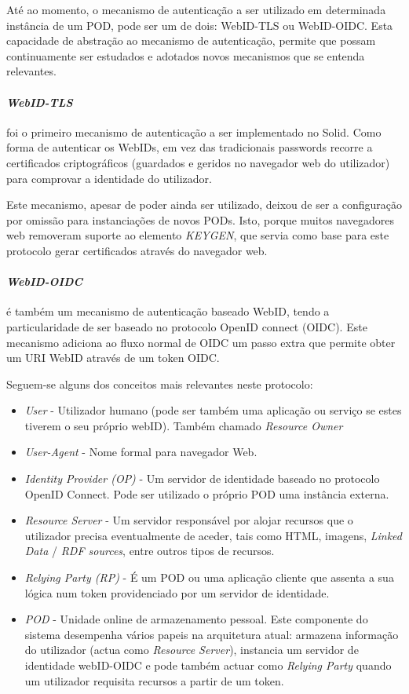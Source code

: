 Até ao momento, o mecanismo de autenticação a ser utilizado em determinada instância de um POD, pode ser um de dois: WebID-TLS ou WebID-OIDC. Esta capacidade de abstração ao mecanismo de autenticação, permite que possam continuamente ser estudados e adotados novos mecanismos que se entenda relevantes.\cite{solid_spec}

\paragraph{\emph{WebID-TLS}}
foi o primeiro mecanismo de autenticação a ser implementado no Solid. Como forma de autenticar os WebIDs, em vez das tradicionais passwords recorre a certificados criptográficos (guardados e geridos no navegador web do utilizador) para comprovar a identidade do utilizador.\cite{solid_webid-tls:}

Este mecanismo, apesar de poder ainda ser utilizado, deixou de ser a configuração por omissão para instanciações de novos PODs. Isto, porque muitos navegadores web removeram suporte ao elemento \emph{KEYGEN}, que servia como base para este protocolo gerar certificados através do navegador web.\cite{solid_webid-tls:}

\paragraph{\emph{WebID-OIDC}}
é também um mecanismo de autenticação baseado WebID, tendo a particularidade de ser baseado no protocolo OpenID connect (OIDC). Este mecanismo adiciona ao fluxo normal de OIDC um passo extra que permite obter um URI WebID através de um token OIDC.\cite{solid_webid_oidc}

Seguem-se alguns dos conceitos mais relevantes neste protocolo:
\begin{itemize}
    \item \emph{User} - Utilizador humano (pode ser também uma aplicação ou serviço se estes tiverem o seu próprio webID). Também chamado \emph{Resource Owner}
    \item \emph{User-Agent} - Nome formal para navegador Web.
    \item \emph{Identity Provider (OP)} - Um servidor de identidade baseado no protocolo OpenID Connect. Pode ser utilizado o próprio POD uma instância externa.
    \item \emph{Resource Server} - Um servidor responsável por alojar recursos que o utilizador precisa eventualmente de aceder, tais como HTML, imagens, \emph{Linked Data} / \emph{RDF sources}, entre outros tipos de recursos.
    \item \emph{Relying Party (RP)} - É um POD ou uma aplicação cliente que assenta a sua lógica num token providenciado por um servidor de identidade.
    \item \emph{POD} - Unidade online de armazenamento pessoal. Este componente do sistema desempenha vários papeis na arquitetura atual: armazena informação do utilizador (actua como \emph{Resource Server}), instancia um servidor de identidade webID-OIDC e pode também actuar como \emph{Relying Party} quando um utilizador requisita recursos a partir de um token.
\end{itemize}

